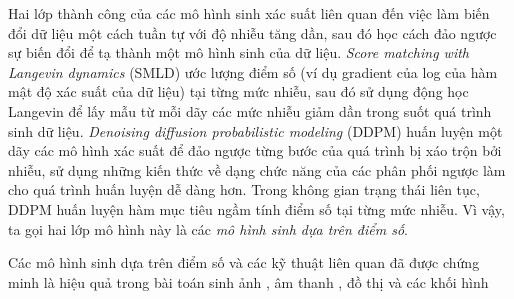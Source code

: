 \documentclass{article} %
\begin{document}
Hai lớp thành công của các mô hình sinh xác suất liên quan đến việc làm biến đổi dữ liệu một cách tuần tự với độ nhiễu tăng dần, sau đó học cách đảo ngược sự biến đổi để tạ thành một mô hình sinh của dữ liệu.
\textit{Score matching with Langevin dynamics} (SMLD) \citep{song2019generative} ước lượng điểm số (ví dụ gradient của log của hàm mật độ xác suất của dữ liệu) tại từng mức nhiễu, sau đó sử dụng động học Langevin để lấy mẫu từ mỗi dãy các mức nhiễu giảm dần trong suốt quá trình sinh dữ liệu.
\textit{Denoising diffusion probabilistic modeling} (DDPM) \citep{sohl2015deep,ho2020denoising} huấn luyện một dãy các mô hình xác suất để đảo ngược từng bước của quá trình bị xáo trộn bởi nhiễu,
sử dụng những kiến thức về dạng chức năng của các phân phối ngược làm cho quá trình huấn luyện dễ dàng hơn.
Trong không gian trạng thái liên tục, DDPM huấn luyện hàm mục tiêu ngầm tính điểm số tại từng mức nhiễu.
Vì vậy, ta gọi hai lớp mô hình này là các \textit{mô hình sinh dựa trên điểm số}.

Các mô hình sinh dựa trên điểm số và các kỹ thuật liên quan \citep{bordes2017learning, goyal2017variational,du2019implicit} đã được chứng minh là hiệu quả trong bài toán sinh ảnh \citep{song2019generative,song2020sliced,ho2020denoising}, âm thanh \citep{chen2020wavegrad,kong2020diffwave}, đồ thị \citep{niu2020permutation} và các khối hình \citep{cai2020learning}



\end{document}
